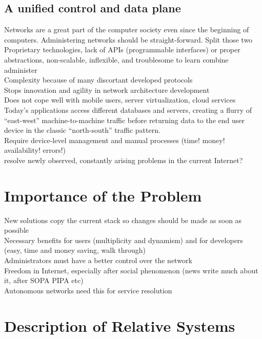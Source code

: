 \documentclass[12pt,a4paper,oneside]{article}
\begin{document}
\newpage
\subsection{A unified control and data plane}
Networks are a great part of the computer society even since the beginning of computers.
Administering networks should be straight-forward. 
Split those two
\\Proprietary technologies, lack of APIs (programmable interfaces) or proper abstractions, non-scalable, inflexible, and troublesome to learn combine administer
\\Complexity because of many discortant developed protocols
\\Stops innovation and agility in network architecture development
\\Does not cope well with mobile users, server virtualization, cloud services
\\Today’s applications access different databases and servers, creating a flurry of “east-west” machine-to-machine traffic before returning data to the end user device in the classic “north-south” traffic pattern.
\\Require device-level management and manual processes (time! money! availability! errors!)
\\resolve newly observed, constantly arising problems in the current Internet?


\newpage
\section{Importance of the Problem}
New solutions copy the current stack so changes should be made as soon as possible
\\Necessary benefits for users (multiplicity and dynamism) and for developers (easy, time and money saving, walk through)
\\Administrators must have a better control over the network
\\Freedom in Internet, especially after social phenomenon (news write much about it, after SOPA PIPA etc)
\\Autonomous networks need this for service resolution


\newpage
\section{Description of Relative Systems}
\end{document}
